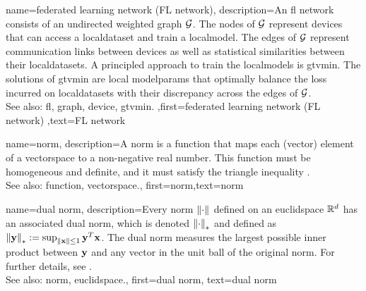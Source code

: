{name={federated learning network (FL network)},
	description={An \gls{fl} network consists of 
		an undirected weighted \gls{graph} $\mathcal{G}$. The nodes of $\mathcal{G}$ represent \glspl{device} 
		that can access a \gls{localdataset} and train a \gls{localmodel}. The edges of $\mathcal{G}$ represent 
		communication links between \glspl{device} as well as statistical similarities between their \glspl{localdataset}. 
		A principled approach to train the \glspl{localmodel} is \gls{gtvmin}. The solutions of \gls{gtvmin} are local 
		\gls{modelparams} that optimally balance the \gls{loss} incurred on \glspl{localdataset} with their discrepancy 
		across the edges of $\mathcal{G}$. 
	    			\\ 
		See also: \gls{fl}, \gls{graph}, \gls{device}, \gls{gtvmin}.}
		,first={federated learning network (FL network)}
		,text={FL network} 
}

{name={norm},
	description={A norm is a \gls{function} that maps each (vector) element 
		of a \gls{vectorspace} to a non-negative real number. This \gls{function} must be 
		homogeneous and definite, and it must satisfy the triangle inequality \cite{HornMatAnalysis}.
		\\
		See also: \gls{function}, \gls{vectorspace}.},
	first={norm},text={norm} 
}

{name={dual norm},
description={Every \gls{norm} $\left\Vert {\cdot} \right\Vert_{}$ defined on an \gls{euclidspace} $\mathbb{R}^{d}$ 
		has an associated dual \gls{norm}, which is denoted $\left\Vert {\cdot} \right\Vert_{*}$ and defined as 
		$\left\Vert {{\bf y}} \right\Vert_{*} := \sup_{\Vert {{\bf x}} \Vert{} \le 1} {\bf y}^{T} {\bf x}$. 
		The dual \gls{norm} measures the largest possible inner product between ${\bf y}$ 
		and any vector in the unit ball of the original \gls{norm}. For further details, see 
		\cite[Sec.~A.1.6]{BoydConvexBook}.
					\\ 
		See also: \gls{norm}, \gls{euclidspace}.},
	first={dual norm},
	text={dual norm}
}

